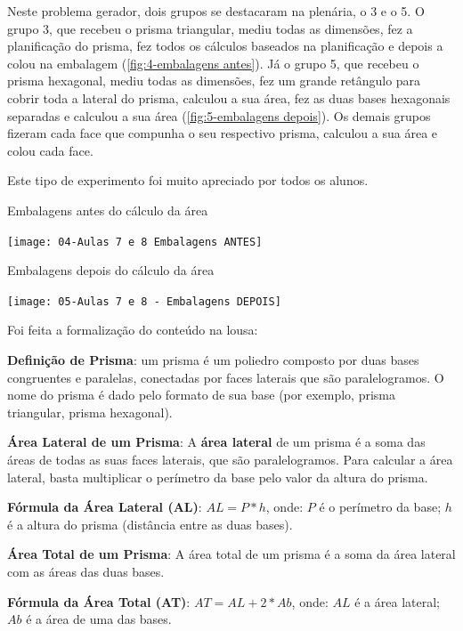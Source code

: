 Neste problema gerador, dois grupos se destacaram na plenária, o 3 e o 5. O grupo 3, que recebeu o prisma triangular, mediu todas as dimensões, fez a planificação do prisma, fez todos os cálculos baseados na planificação e depois a colou na embalagem (\autoref{fig:4-embalagens antes}). Já o grupo 5, que recebeu o prisma hexagonal, mediu todas as dimensões, fez um grande retângulo para cobrir toda a lateral do prisma, calculou a sua área, fez as duas bases hexagonais separadas e calculou a sua área (\autoref{fig:5-embalagens depois}). Os demais grupos fizeram cada face que compunha o seu respectivo prisma, calculou a sua área e colou cada face.

Este tipo de experimento foi muito apreciado por todos os alunos.

\begin{CenteredFigure}
    \caption{Embalagens antes do cálculo da área} \label{fig:4-embalagens antes}
    \texttt{[image: 04-Aulas 7 e 8 Embalagens ANTES]}
    \legend{\autoria}
\end{CenteredFigure}

\begin{CenteredFigure}
    \caption{Embalagens depois do cálculo da área} \label{fig:5-embalagens depois}
    \texttt{[image: 05-Aulas 7 e 8 - Embalagens DEPOIS]}
    \legend{\autoria}
\end{CenteredFigure}

Foi feita a formalização do conteúdo na lousa:

\textbf{Definição de Prisma}: um prisma é um poliedro composto por duas bases congruentes e paralelas, conectadas por faces laterais que são paralelogramos. O nome do prisma é dado pelo formato de sua base (por exemplo, prisma triangular, prisma hexagonal).

\textbf{Área Lateral de um Prisma}: A \textbf{área lateral} de um prisma é a soma das áreas de todas as suas faces laterais, que são paralelogramos. Para calcular a área lateral, basta multiplicar o perímetro da base pelo valor da altura do prisma.

\textbf{Fórmula da Área Lateral (AL)}: $AL = P * h$, onde: $P$ é o perímetro da base; $h$ é a altura do prisma (distância entre as duas bases).

\textbf{Área Total de um Prisma}: A área total de um prisma é a soma da área lateral com as áreas das duas bases.

\textbf{Fórmula da Área Total (AT)}: $AT = AL + 2 * Ab$, onde: $AL$ é a área lateral; $Ab$ é a área de uma das bases.

